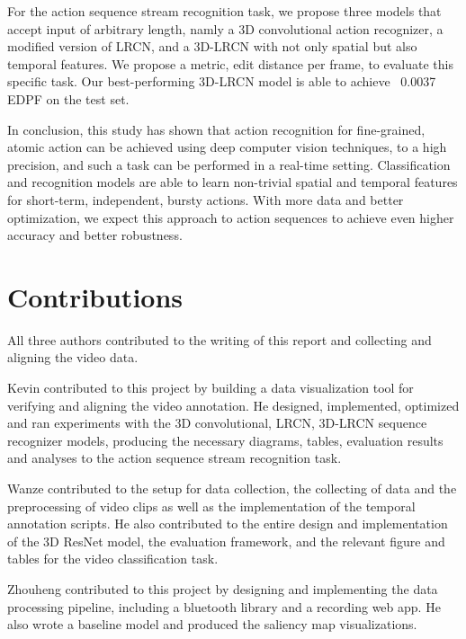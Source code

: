 \documentclass[10pt,twocolumn,letterpaper]{article}
\begin{document}
For the action sequence stream recognition task, we propose three models that accept input of arbitrary length, namly a 3D convolutional action recognizer, a modified version of LRCN, and a 3D-LRCN with not only spatial but also temporal features. We propose a metric, edit distance per frame, to evaluate this specific task. Our best-performing 3D-LRCN model is able to achieve ~0.0037 EDPF on the test set. 

In conclusion, this study has shown that action recognition for fine-grained, atomic action can be achieved using deep computer vision techniques, to a high precision, and such a task can be performed in a real-time setting. Classification and recognition models are able to learn non-trivial spatial and temporal features for short-term, independent, bursty actions. With more data and better optimization, we expect this approach to action sequences to achieve even higher accuracy and better robustness. 


\section*{Contributions}

All three authors contributed to the writing of this report and collecting and aligning the video data.

Kevin contributed to this project by building a data visualization tool for verifying and aligning the video annotation. He designed, implemented, optimized and ran experiments with the 3D convolutional, LRCN, 3D-LRCN sequence recognizer models,  producing the necessary diagrams, tables, evaluation results and analyses to the action sequence stream recognition task.

Wanze contributed to the setup for data collection, the collecting of data and the preprocessing of video clips as well as the implementation of the temporal annotation scripts. He also contributed to the entire design and implementation of the 3D ResNet model, the evaluation framework, and the relevant figure and tables for the video classification task.

Zhouheng contributed to this project by designing and implementing the data processing pipeline, including a bluetooth library and a recording web app. He also wrote a baseline model and produced the saliency map visualizations.

{\small


}

\clearpage
\end{document}
